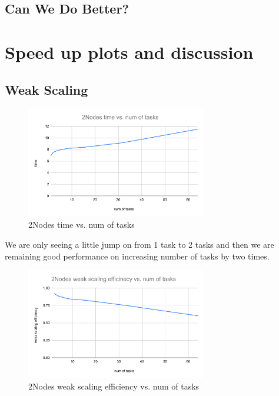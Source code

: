 \documentclass{article}
\begin{document}
\subsection{Can We Do Better?}

\section{Speed up plots and discussion}
\subsection{Weak Scaling}
\begin{figure}[H] %
\centering %
\includegraphics[width=0.7\textwidth]{figures/2Nodes time vs. num of tasks.pdf} %
\caption{2Nodes time vs. num of tasks} %
\label{2Nodes time vs. num of tasks} %
\end{figure}

We are only seeing a little jump on from 1 task to 2 tasks and then we are remaining good performance on increasing number of tasks by two times.


\begin{figure}[H] %
\centering %
\includegraphics[width=0.7\textwidth]{figures/2Nodes weak scaling efficinecy vs. num of tasks.pdf} %
\caption{2Nodes weak scaling efficiency vs. num of tasks} %
\label{2Nodes weak scaling efficinecy vs. num of tasks} %
\end{figure}
\end{document}

